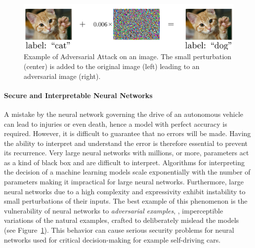 \begin{figure}[htb]
  \centering
  \includegraphics[width=\textwidth]{figures/chapter1/ExampleAdversarialCatDog.pdf}
  \caption{Example of Adversarial Attack on an image. The small perturbation (center) is added to the original image (left) leading to an adversarial image (right).}
  \label{figure:adversarial_image_example}
\end{figure}

\paragraph{Secure and Interpretable Neural Networks}
A mistake by the neural network governing the drive of an autonomous vehicle can lead to injuries or even death, hence a model with perfect accuracy is required.
However, it is difficult to guarantee that no errors will be made.
Having the ability to interpret and understand the error is therefore essential to prevent its recurrence.
Very large neural networks with millions, or more, parameters act as a kind of black box and are difficult to interpret.
Algorithms \cite{lundberg2017unified} for interpreting the decision of a machine learning models scale exponentially with the number of parameters making it impractical for large neural networks. 
Furthermore, large neural networks due to a high complexity and expressivity exhibit instability to small perturbations of their inputs.
The best example of this phenomenon is the vulnerability of neural networks to \emph{adversarial examples}, \ie, imperceptible variations of the natural examples, crafted to deliberately mislead the models~\cite{globerson2006nightmare,biggio2013evasion,Szegedy2013IntriguingPO} (see Figure~\ref{figure:adversarial_image_example}). 
This behavior can cause serious security problems for neural networks used for critical decision-making for example self-driving cars.



